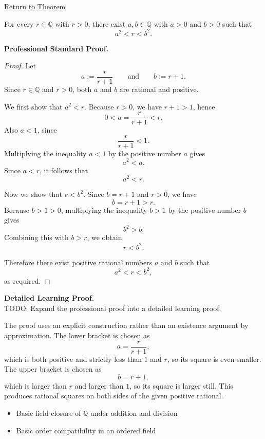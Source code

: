 \newpage
{}
\label{prf:rational-square-bracketing}

\begin{remark*}[Return]
\hyperref[thm:rational-square-bracketing]{Return to Theorem}
\end{remark*}

\begin{theorem*}
For every $r\in\mathbb{Q}$ with $r>0$, there exist $a,b\in\mathbb{Q}$ with
$a>0$ and $b>0$ such that
\[
a^2<r<b^2.
\]
\end{theorem*}

\textbf{Professional Standard Proof.}~\\
\begin{proof}
Let
\[
a:=\frac{r}{r+1}
\qquad\text{and}\qquad
b:=r+1.
\]
Since $r\in\mathbb{Q}$ and $r>0$, both $a$ and $b$ are rational and positive.

We first show that $a^2<r$. Because $r>0$, we have $r+1>1$, hence
\[
0<a=\frac{r}{r+1}<r.
\]
Also $a<1$, since
\[
\frac{r}{r+1}<1.
\]
Multiplying the inequality $a<1$ by the positive number $a$ gives
\[
a^2<a.
\]
Since $a<r$, it follows that
\[
a^2<r.
\]

Now we show that $r<b^2$. Since $b=r+1$ and $r>0$, we have
\[
b=r+1>r.
\]
Because $b>1>0$, multiplying the inequality $b>1$ by the positive number $b$
gives
\[
b^2>b.
\]
Combining this with $b>r$, we obtain
\[
r<b^2.
\]

Therefore there exist positive rational numbers $a$ and $b$ such that
\[
a^2<r<b^2,
\]
as required.
\end{proof}

\textbf{Detailed Learning Proof.}~\\
TODO: Expand the professional proof into a detailed learning proof.


\begin{remark*}
The proof uses an explicit construction rather than an existence argument by
approximation. The lower bracket is chosen as
\[
a=\frac{r}{r+1},
\]
which is both positive and strictly less than $1$ and $r$, so its square is
even smaller. The upper bracket is chosen as
\[
b=r+1,
\]
which is larger than $r$ and larger than $1$, so its square is larger still.
This produces rational squares on both sides of the given positive rational.
\end{remark*}

\begin{dependencies}
\begin{itemize}
  \item Basic field closure of $\mathbb{Q}$ under addition and division
  \item Basic order compatibility in an ordered field
\end{itemize}
\end{dependencies}
